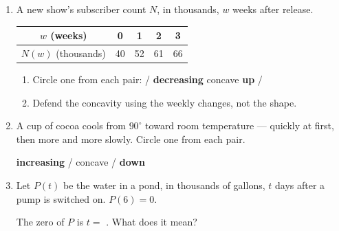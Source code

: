 \documentclass[10pt]{article}
\begin{document}

\vspace{0.12in}

\begin{enumerate}[itemsep=12pt]

\item A new show's subscriber count $N$, in thousands, $w$ weeks after release.

\smallskip
\renewcommand{\arraystretch}{1.4}
\begin{tabular}{|c|c|c|c|c|}
\hline
$w$ (weeks) & 0 & 1 & 2 & 3 \\
\hline
$N(w)$ (thousands) & 40 & 52 & 61 & 66 \\
\hline
\end{tabular}
\smallskip

\begin{enumerate}[label=(\alph*), itemsep=6pt]
  \item Circle one from each pair: \quad
         / \textbf{decreasing} \qquad
        concave \textbf{up} / 
  \item Defend the concavity using the weekly changes, not the shape.

        \vspace{0.05in}
\end{enumerate}

\item A cup of cocoa cools from $90^\circ$ toward room temperature --- quickly
      at first, then more and more slowly. Circle one from each pair.

\vspace{0.05in}
\textbf{increasing} /  \qquad concave  / \textbf{down}

\item Let $P(t)$ be the water in a pond, in thousands of gallons, $t$ days
      after a pump is switched on. $P(6) = 0$.

\vspace{0.05in}
The zero of $P$ is $t = $ . What does it mean?

\vspace{0.05in}

\end{enumerate}
\end{document}
